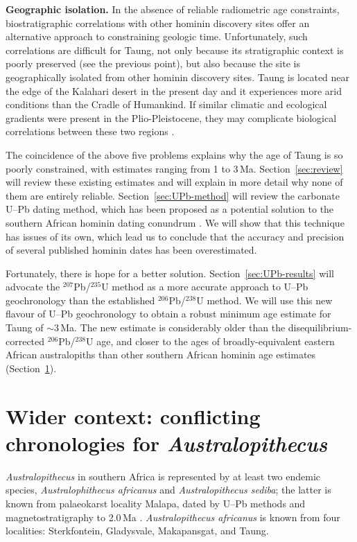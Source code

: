 \documentclass[11pt]{article}
\begin{document}
\textbf{Geographic isolation.} In the absence of reliable radiometric
age constraints, biostratigraphic correlations with other hominin
discovery sites offer an alternative approach to constraining geologic
time.  Unfortunately, such correlations are difficult for Taung, not
only because its stratigraphic context is poorly preserved (see the
previous point), but also because the site is geographically isolated
from other hominin discovery sites. Taung is located near the edge of
the Kalahari desert in the present day and it experiences more arid
conditions than the Cradle of Humankind. If similar climatic and
ecological gradients were present in the Plio-Pleistocene, they may
complicate biological correlations between these two regions
\citep{mckee1993}.

The coincidence of the above five problems explains why the age of
Taung is so poorly constrained, with estimates ranging from 1 to
3\,Ma. Section~\ref{sec:review} will review these existing estimates
and will explain in more detail why none of them are entirely
reliable. Section~\ref{sec:UPb-method} will review the carbonate U--Pb
dating method, which has been proposed as a potential solution to the
southern African hominin dating conundrum \citep{woodhead2012}. We
will show that this technique has issues of its own, which lead us to
conclude that the accuracy and precision of several published hominin
dates has been overestimated.

Fortunately, there is hope for a better solution.
Section~\ref{sec:UPb-results} will advocate the
${}^{207}$Pb/${}^{235}$U method as a more accurate approach to U--Pb
geochronology than the established ${}^{206}$Pb/${}^{238}$U method. We
will use this new flavour of U--Pb geochronology to obtain a robust
minimum age estimate for Taung of $\sim{3}\,$Ma.  The new estimate is
considerably older than the disequilibrium-corrected
${}^{206}$Pb/${}^{238}$U age, and closer to the ages of
broadly-equivalent eastern African australopiths than other southern
African hominin age estimates (Section~\ref{sec:EastVsSouth}).

\section{Wider context: conflicting chronologies for \emph{Australopithecus}}
\label{sec:EastVsSouth}

\emph{Australopithecus} in southern Africa is represented by at least
two endemic species, \emph{Australophithecus africanus} and
\emph{Australopithecus sediba}; the latter is known from palaeokarst
locality Malapa, dated by U--Pb methods and magnetostratigraphy to
2.0\,Ma \citep{pickering2011a}.  \emph{Australopithecus africanus} is
known from four localities: Sterkfontein, Gladysvale, Makapansgat, and
Taung.
\end{document}
